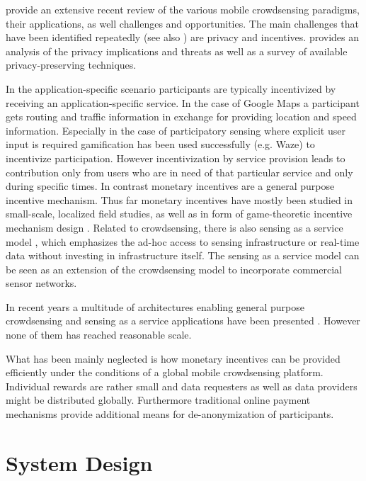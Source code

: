 \cite{guo2015mobile} provide an extensive recent review of the various mobile crowdsensing paradigms, their applications, as well challenges and opportunities. 
The main challenges that have been identified repeatedly (see also \cite{he2015privacy}) are privacy and incentives. \cite{Christin2015} provides an analysis of the privacy implications and threats as well as a survey of available privacy-preserving techniques. 

In the application-specific scenario participants are typically incentivized by receiving an application-specific service. In the case of Google Maps a participant gets routing and traffic information in exchange for providing location and speed information. Especially in the case of participatory sensing where explicit user input is required gamification \cite{Deterding:2011:GDE:2181037.2181040} has been used successfully (e.g. Waze) to incentivize participation. However incentivization by service provision leads to contribution only from users who are in need of that particular service and only during specific times. In contrast monetary incentives are a general purpose incentive mechanism. Thus far monetary incentives have mostly been studied in small-scale, localized field studies, as well as in form of game-theoretic incentive mechanism design \cite{7101300}. 
Related to crowdsensing, there is also sensing as a service model \cite{Sheng:2013cm,ETT:ETT2704}, which emphasizes the ad-hoc access to sensing infrastructure or real-time data without investing in infrastructure itself. The sensing as a service model can be seen as an extension of the crowdsensing model to incorporate commercial sensor networks.

In recent years a multitude of architectures enabling general purpose crowdsensing and sensing as a service applications have been presented \cite{6558754,6525603,giannotti2012planetary,Haderer2015,merlino2016mobile}. However none of them has reached reasonable scale.

What has been mainly neglected is how monetary incentives can be provided efficiently under the conditions of a global mobile crowdsensing platform. 
Individual rewards are rather small and data requesters as well as data providers might be distributed globally. Furthermore traditional online payment mechanisms provide additional means for de-anonymization of participants. 


\section{System Design}

